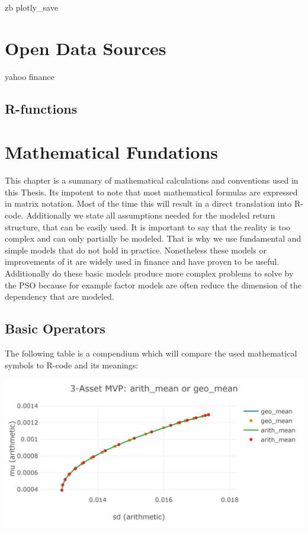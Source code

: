 \documentclass[
  oneside]{book}
\begin{document}
zb plotly\_save

\hypertarget{open-data-sources}{%
\chapter{Open Data Sources}\label{open-data-sources}}

yahoo finance

\hypertarget{r-functions-1}{%
\section{R-functions}\label{r-functions-1}}

\hypertarget{mathematical-fundations}{%
\chapter{Mathematical Fundations}\label{mathematical-fundations}}

This chapter is a summary of mathematical calculations and conventions used in this Thesis. Its impotent to note that most mathematical formulas are expressed in matrix notation. Most of the time this will result in a direct translation into R-code. Additionally we state all assumptions needed for the modeled return structure, that can be easily used. It is important to say that the reality is too complex and can only partially be modeled. That is why we use fundamental and simple models that do not hold in practice. Nonetheless these models or improvements of it are widely used in finance and have proven to be useful. Additionally do these basic models produce more complex problems to solve by the PSO because for example factor models are often reduce the dimension of the dependency that are modeled.

\hypertarget{basic-operators}{%
\section{Basic Operators}\label{basic-operators}}

The following table is a compendium which will compare the used mathematical symbols to R-code and its meanings:

\includegraphics{Master_Thesis_files/figure-latex/unnamed-chunk-4-1.png}
\end{document}

